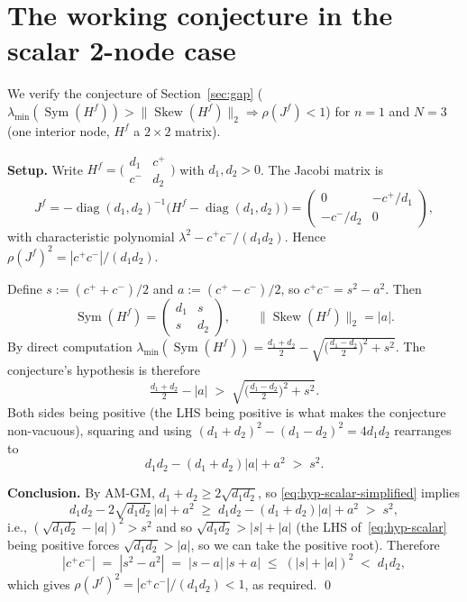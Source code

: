 \documentclass{article}
\newcommand{\Sym}{\operatorname{Sym}}
\newcommand{\Skew}{\operatorname{Skew}}
\begin{document}
\appendix
\section{The working conjecture in the scalar 2-node case}\label{app:conjecture-scalar}

We verify the conjecture of Section~\ref{sec:gap}
($\lambda_{\min}(\Sym(H^f)) > \|\Skew(H^f)\|_2 \Rightarrow \rho(J^f) < 1$)
for $n = 1$ and $N = 3$ (one interior node, $H^f$ a $2\times 2$ matrix).

\noindent\textbf{Setup.} Write $H^f = \bigl(\begin{smallmatrix} d_1 & c^+ \\ c^- & d_2 \end{smallmatrix}\bigr)$
with $d_1, d_2 > 0$. The Jacobi matrix is
\[
    J^f = -\operatorname{diag}(d_1, d_2)^{-1}\bigl(H^f - \operatorname{diag}(d_1, d_2)\bigr)
    = \begin{pmatrix} 0 & -c^+/d_1 \\ -c^-/d_2 & 0 \end{pmatrix},
\]
with characteristic polynomial $\lambda^2 - c^+ c^- / (d_1 d_2)$. Hence
$\rho(J^f)^2 = |c^+ c^-| / (d_1 d_2)$.

Define $s := (c^+ + c^-)/2$ and $a := (c^+ - c^-)/2$, so $c^+ c^- = s^2 - a^2$.
Then
\[
    \Sym(H^f) = \begin{pmatrix} d_1 & s \\ s & d_2 \end{pmatrix},
    \qquad
    \|\Skew(H^f)\|_2 = |a|.
\]
By direct computation
$\lambda_{\min}(\Sym(H^f)) = \tfrac{d_1 + d_2}{2} - \sqrt{\bigl(\tfrac{d_1 - d_2}{2}\bigr)^2 + s^2}$.
The conjecture's hypothesis is therefore
\begin{equation}
    \tfrac{d_1 + d_2}{2} - |a| \;>\; \sqrt{\bigl(\tfrac{d_1 - d_2}{2}\bigr)^2 + s^2}.
    \label{eq:hyp-scalar}
\end{equation}
Both sides being positive (the LHS being positive is what makes the conjecture
non-vacuous), squaring and using $(d_1+d_2)^2 - (d_1-d_2)^2 = 4 d_1 d_2$ rearranges to
\begin{equation}
    d_1 d_2 - (d_1 + d_2)|a| + a^2 \;>\; s^2.
    \label{eq:hyp-scalar-simplified}
\end{equation}

\noindent\textbf{Conclusion.} By AM-GM, $d_1 + d_2 \geq 2 \sqrt{d_1 d_2}$, so
\eqref{eq:hyp-scalar-simplified} implies
\[
    d_1 d_2 - 2 \sqrt{d_1 d_2}\,|a| + a^2 \;\geq\; d_1 d_2 - (d_1 + d_2)|a| + a^2 \;>\; s^2,
\]
i.e., $(\sqrt{d_1 d_2} - |a|)^2 > s^2$ and so $\sqrt{d_1 d_2} > |s| + |a|$
(the LHS of~\eqref{eq:hyp-scalar} being positive forces $\sqrt{d_1 d_2} > |a|$,
so we can take the positive root). Therefore
\[
    |c^+ c^-| \;=\; |s^2 - a^2| \;=\; |s - a|\,|s + a| \;\leq\; (|s| + |a|)^2 \;<\; d_1 d_2,
\]
which gives $\rho(J^f)^2 = |c^+ c^-|/(d_1 d_2) < 1$, as required. \qed
\end{document}
